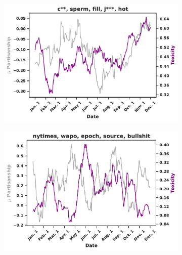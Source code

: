 \begin{figure}
\begin{subfigure}[l]{0.32\textwidth}
\includegraphics[width=1\columnwidth]{figures/c__-toxic-swing-final-20240425.pdf} 
\caption{}
\label{fig:cum}
\end{subfigure}
\begin{subfigure}[l]{0.32\textwidth}
\includegraphics[width=1\columnwidth]{figures/nytimes-toxic-swing-final-20240425.pdf} 
\caption{}
\label{fig:nytimes}


\end{subfigure}
\end{figure}
